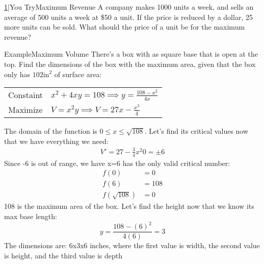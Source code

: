 \documentclass{MathNotes}
\newenvironment{example}[1]{\begin{BlueBox}{Example}{#1}}{\end{BlueBox}}
\newenvironment{practice}[2]{\begin{PurpleBox}{\texorpdfstring{#1}\Big|You Try}{#2}}{\end{PurpleBox}}
\begin{document}
\begin{practice}{\hyperref[ans:3.5-1]{1}}{Maximum Revenue}\label{prac:3.5-1}
	A company makes 1000 units a week, and sells an average of 500 units a week at \$50 a unit. If the price is reduced by a dollar, 25 more units can be sold. What should the price of a unit be for the maximum revenue?
\end{practice}
\begin{example}{Maximum Volume}
	There's a box with as square base that is open at the top. Find the dimensions of the box with the maximum area, given that the box only has $102\text{in}^2$ of surface area:\newline
	\begin{center}
		\begin{tabular}{ll}
			Constaint & $x^2+4xy=108\implies y=\frac{108-x^2}{4x}$ \\
			Maximize  & $V=x^2y\implies V=27x-\frac{x^3}{4}$
		\end{tabular}
	\end{center}
	The domain of the function is $0\leq x\leq\sqrt{108}$. Let's find its critical
	values now that we have everything we need:
	\begin{align*}
		V'=27-\frac{3}{4}x^2
		0=\pm 6
	\end{align*}
	Since -6 is out of range, we have x=6 has the only valid critical number:
	\begin{align*}
		f(0)          & =0   \\
		f(6)          & =108 \\
		f(\sqrt{108}) & =0
	\end{align*}
	108 is the maximum area of the box. Let's find the height now that we know its
	max base length: $$y=\frac{108-(6)^2}{4(6)}=3$$
	The dimensions are: 6x3x6 inches, where the first value is width, the second value is height, and the third value is depth
\end{example}

\end{document}
